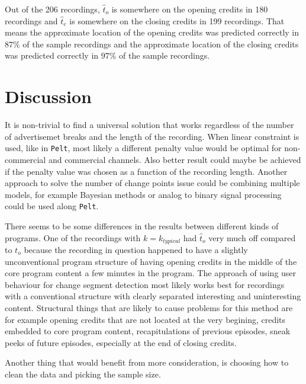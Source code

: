 Out of the 206 recordings, $\hat{t}_o$ is somewhere on the opening credits in 180 recordings and $\hat{t}_e$ is somewhere on the closing credits in 199 recordings. 
That means the approximate location of the opening credits was predicted correctly in $87\%$ of the sample recordings and the approximate location of the closing credits was predicted correctly in $97\%$ of the sample recordings.

\section{Discussion} \label{sec:discussion}

It is non-trivial to find a universal solution that works regardless of the number of advertisemet breaks and the length of the recording. When linear constraint is used, like in \texttt{Pelt}, most likely a different penalty value would be optimal for non-commercial and commercial channels. Also better result could maybe be achieved if the penalty value was chosen as a function of the recording length. Another approach to solve the number of change points issue could be combining multiple models, for example Bayesian methods or analog to binary signal processing could be used along \texttt{Pelt}.

There seems to be some differences in the results between different kinds of programs. One of the recordings with $k=k_{typical}$ had $\hat{t}_o$ very much off compared to $t_o$ because the recording in question happened to have a slightly
unconventional program structure of having opening credits in the middle of the core program content a few minutes in the program. The approach of using user behaviour for change segment detection most likely works best for recordings with a conventional structure with clearly separated interesting and uninteresting content. Structural things that are likely to cause problems for this method are for example opening credits that are not located at the very begining, credits embedded to core program content, recapitulations of previous episodes, sneak peeks of future episodes, especially at the end of closing credits.

Another thing that would benefit from more consideration, is choosing how to clean the data and picking the sample size.

